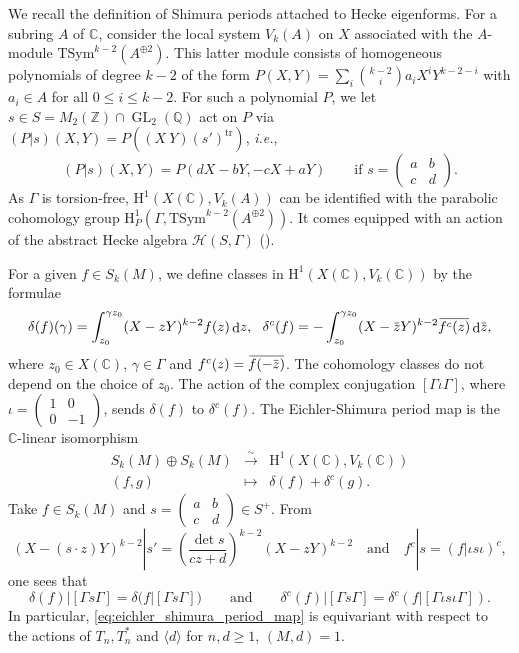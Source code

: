 \documentclass[12pt]{amsart}
\newcommand\bC{\mathbb{C}}
\newcommand\bZ{\mathbb{Z}}
\newcommand\bQ{\mathbb{Q}}
\newcommand\cH{\mathcal{H}}
\newcommand{\ob}[1]{\mkern 1.5mu\overline{\mkern-1.5mu#1\mkern-1.5mu}\mkern 1.5mu}
\DeclareMathOperator{\GL}{GL}
\DeclareMathOperator{\diff}{d}
\newcommand{\HH}{\mathrm{H}}
\theoremstyle{defstyle}
\theoremstyle{thmstyle}
\begin{document}
We recall the definition of Shimura periods attached to Hecke eigenforms. For a subring $A$ of $\bC$, consider the local system $V_k(A)$ on $X$ associated with the $A$-module $\textrm{TSym}^{k-2}(A^{\oplus 2})$. This latter module consists of homogeneous polynomials of degree $k-2$ of the form $P(X,Y)=\sum_{i} \binom{k-2}{i}a_{i}X^iY^{k-2-i}$ with $a_i\in A$ for all $0\leq i \leq k-2$. For such a polynomial $P$, we let $s\in S=M_2(\bZ)\cap \GL_2(\bQ)$ act on $P$ via $(P|s)(X,Y)=P( (X\ Y) (s')^\textrm{tr})$, \textit{i.e.},
	 \[(P|s)(X,Y)=P(dX-bY,-cX+aY) \qquad \mbox{if } s=\begin{pmatrix}a & b \\ c & d\end{pmatrix}.\]
As $\Gamma$ is torsion-free,  $\HH^1(X(\bC),V_k(A))$ can be identified with the parabolic cohomology group  $\HH_P^1(\Gamma,\textrm{TSym}^{k-2}(A^{\oplus 2}))$. It comes equipped with an action of the abstract Hecke algebra $\cH(S,\Gamma)$ (\cite[\S6.3]{hidaLFE}). 

For a given $f\in S_k(M)$, we define classes in $\HH^1(X(\bC),V_k(\bC))$ by the formulae
	\[
	\delta(f)(\gamma)=\int_{z_0}^{\gamma z_0}(X-zY)^{k-2}f(z)\diff\!z, \ \ \delta^c(f)=-\int_{z_0}^{\gamma z_0}(X-\ob{z}Y)^{k-2}\ob{f^c(z)}\diff\! \ob{z},
	\]
where $z_0\in X(\bC)$, $\gamma\in \Gamma$ and $f^c(z)=\ob{f(-\ob{z})}$. The cohomology classes do not depend on the choice of $z_0$. The action of the complex conjugation $[\Gamma\iota\Gamma]$, where $\iota=\left(\begin{smallmatrix}1 & 0 \\ 0 & -1\end{smallmatrix}\right)$, sends $\delta(f)$ to $\delta^c(f)$. The Eichler-Shimura period map is the $\bC$-linear isomorphism 
\begin{equation}\label{eq:eichler_shimura_period_map}
	\begin{array}{ccc}
	S_k(M) \oplus S_k(M) & \overset{\sim}{\longrightarrow} & \HH^1(X(\bC),V_k(\bC)) \\ 
	(f,g) & \mapsto & \delta(f)+\delta^c(g).
\end{array}
\end{equation}
Take $f\in S_k(M)$ and $s=\left(\begin{smallmatrix}a & b \\ c & d\end{smallmatrix}\right)\in S^+$. From 
\[(X-(s\cdot z)Y)^{k-2}|s'=\left(\frac{\det s}{cz+d}\right)^{k-2}(X-zY)^{k-2} \quad \mbox{and}\quad f^c|s=(f|\iota s \iota)^c, \]
one sees that 
\begin{equation}\label{eq:action_slash_cohomology}
	\delta(f)|[\Gamma s \Gamma]=\delta(f|[\Gamma s \Gamma]) \qquad \mbox{and}\qquad \delta^c(f)|[\Gamma s \Gamma]=\delta^c(f|[\Gamma \iota s\iota \Gamma]).
\end{equation}
In particular, \eqref{eq:eichler_shimura_period_map} is equivariant with respect to the actions of $T_n,T^*_n$ and $\langle d \rangle$ for $n,d\geq 1$, $(M,d)=1$. 
\end{document}
